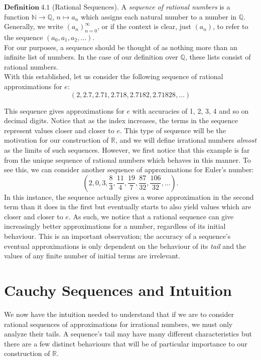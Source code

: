 \documentclass[12pt]{article}
\theoremstyle{definition}
\theoremstyle{remark}
\begin{document}
\noindent $\mathbf{Definition\ 4.1}$ (Rational Sequences)\cite[pg.681]{calc}.
        A \textit{sequence of rational numbers} is a function $\mathbb{N}\rightarrow\mathbb{Q}$, $n\mapsto a_n$ which assigns each natural number to a number in $\mathbb{Q}$. Generally, we write $(a_n)_{n=0}^\infty$, or if the context is clear, just $(a_n)$, to refer to the sequence $(a_0,a_1,a_2,...)$.\\

\noindent For our purposes, a sequence should be thought of as nothing more than an infinite list of numbers. In the case of our definition over $\mathbb{Q}$, these lists consist of rational numbers.\\

\noindent With this established, let us consider the following sequence of rational approximations for $e$:
$$\left( 2,2.7,2.71,2.718,2.7182,2.71828,...\right)$$

\noindent This sequence gives approximations for $e$ with accuracies of 1, 2, 3, 4 and so on decimal digits. Notice that as the index increases, the terms in the sequence represent values closer and closer to $e$. This type of sequence will be the motivation for our construction of $\mathbb{R}$, and we will define irrational numbers \textit{almost} as the limits of such sequences. However, we first notice that this example is far from the unique sequence of rational numbers which behaves in this manner. To see this, we can consider another sequence of approximations for Euler's number:
$$\left( 2,0,3,\frac{8}{3},\frac{11}{4},\frac{19}{7},\frac{87}{32},\frac{106}{32},...\right).$$
In this instance, the sequence actually gives a worse approximation in the second term than it does in the first but eventually starts to also yield values which are closer and closer to $e$. As such, we notice that a rational sequence can give increasingly better approximations for a number, regardless of its initial behaviour. This is an important observation; the accuracy of a sequence's eventual approximations is only dependent on the behaviour of its \textit{tail} and the values of any finite number of initial terms are irrelevant.
\section{Cauchy Sequences and Intuition}
We now have the intuition needed to understand that if we are to consider rational sequences of approximations for irrational numbers, we must only analyze their tails. A sequence's tail may have many different characteristics but there are a few distinct behaviours that will be of particular importance to our construction of $\mathbb{R}$.\\
\end{document}
